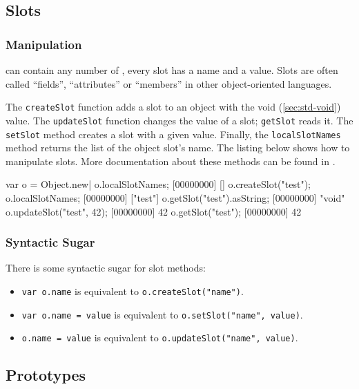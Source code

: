\subsection{Slots}

\subsubsection{Manipulation}

 can contain any number of , every slot has a
name and a value. Slots are often called ``fields'', ``attributes'' or
``members'' in other object-oriented languages.

The \lstinline|createSlot| function adds a slot to an object with the
void (\autoref{sec:std-void}) value. The \lstinline|updateSlot|
function changes the value of a slot; \lstinline|getSlot| reads
it. The \lstinline|setSlot| method creates a slot with a given
value. Finally, the \lstinline|localSlotNames| method returns the list of
the object slot's name. The listing below shows how to manipulate
slots. More documentation about these methods can be found in
.

\begin{urbiscript}
var o = Object.new|
o.localSlotNames;
[00000000] []
o.createSlot("test");
o.localSlotNames;
[00000000] ["test"]
o.getSlot("test").asString;
[00000000] "void"
o.updateSlot("test", 42);
[00000000] 42
o.getSlot("test");
[00000000] 42
\end{urbiscript}

\subsubsection{Syntactic Sugar}

There is some syntactic sugar for slot methods:
\begin{itemize}
\item \lstinline|var o.name| is equivalent to
  \lstinline|o.createSlot("name")|.
\item \lstinline|var o.name = value| is equivalent to
  \lstinline|o.setSlot("name", value)|.
\item \lstinline|o.name = value| is equivalent to
  \lstinline|o.updateSlot("name", value)|.
\end{itemize}


\subsection{Prototypes}

